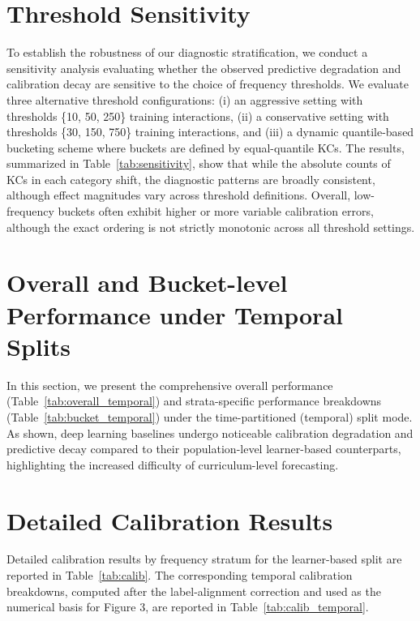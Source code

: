 \section{Threshold Sensitivity}
\label{app:sensitivity}
To establish the robustness of our diagnostic stratification, we conduct a sensitivity analysis evaluating whether the observed predictive degradation and calibration decay are sensitive to the choice of frequency thresholds. We evaluate three alternative threshold configurations: (i) an aggressive setting with thresholds \{10, 50, 250\} training interactions, (ii) a conservative setting with thresholds \{30, 150, 750\} training interactions, and (iii) a dynamic quantile-based bucketing scheme where buckets are defined by equal-quantile KCs. The results, summarized in Table~\ref{tab:sensitivity}, show that while the absolute counts of KCs in each category shift, the diagnostic patterns are broadly consistent, although effect magnitudes vary across threshold definitions. Overall, low-frequency buckets often exhibit higher or more variable calibration errors, although the exact ordering is not strictly monotonic across all threshold settings.


\FloatBarrier

\section{Overall and Bucket-level Performance under Temporal Splits}
\label{app:temporal_performance}
In this section, we present the comprehensive overall performance (Table~\ref{tab:overall_temporal}) and strata-specific performance breakdowns (Table~\ref{tab:bucket_temporal}) under the time-partitioned (temporal) split mode. As shown, deep learning baselines undergo noticeable calibration degradation and predictive decay compared to their population-level learner-based counterparts, highlighting the increased difficulty of curriculum-level forecasting.




\clearpage
\onecolumn
\section{Detailed Calibration Results}
\label{app:calibration_performance}
Detailed calibration results by frequency stratum for the learner-based split are reported in Table~\ref{tab:calib}. The corresponding temporal calibration breakdowns, computed after the label-alignment correction and used as the numerical basis for Figure 3, are reported in Table~\ref{tab:calib_temporal}.

